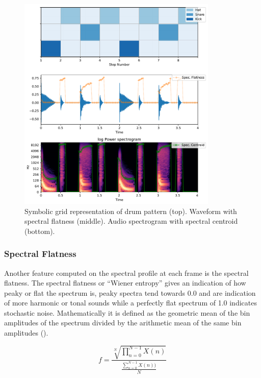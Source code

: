 {{\begin{figure}
	\begin{center}
		\includegraphics[width=0.85\textwidth]{ch05_pyconcat/figures/spectral_features.pdf}
	\end{center}
	\caption[Spectral features of a drum pattern]{Symbolic grid representation of drum pattern (top). Waveform with spectral flatness (middle). Audio spectrogram with spectral centroid (bottom).}
	\label{fig:spectral_features}
\end{figure}

\subsubsection{Spectral Flatness}

Another feature computed on the spectral profile at each frame is the spectral flatness. The spectral flatness or ``Wiener entropy'' gives an indication of how peaky or flat the spectrum is, peaky spectra tend towards 0.0 and are indication of more harmonic or tonal sounds while a perfectly flat spectrum of 1.0 indicates stochastic noise. Mathematically it is defined as the geometric mean of the bin amplitudes of the spectrum divided by the arithmetic mean of the same bin amplitudes (). 

\begin{equation}
\label{eq:flatness}	
f=\frac{\sqrt[N]{\prod_{n=0}^{N-1}X(n)}}{\frac{\sum_{n=0}^{N-1}X(n))}{N}}
\end{equation}

}}
